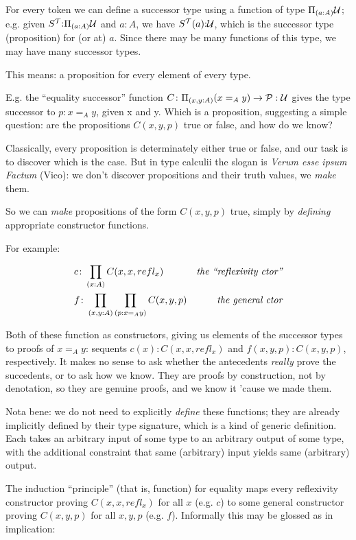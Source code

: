 \documentclass{article}
\begin{document}
For every token we can define a successor type using a function of
type \(\Pi_{(a:A)}\mathcal{U}\); e.g. given
\(S^{\mathcal{T}}{:}\Pi_{(a:A)}\mathcal{U}\) and \(a{:}A\), we have
\(S^{\mathcal{T}}(a){:}\mathcal{U}\), which is the successor type
(proposition) for (or at) \(a\).  Since there may be many functions of
this type, we may have many successor types.

This means: a proposition for every element of every type.

E.g. the ``equality successor'' function \(C\colon\Pi_{(x,y:A)}(x=_Ay)\to\mathcal{P:U}\) gives the type
successor to \(p{:}x=_Ay\), given x and y.  Which is a proposition,
suggesting a simple question: are the propositions \(C(x,y,p)\) true
or false, and how do we know?

Classically, every proposition is determinately either true or false,
and our task is to discover which is the case.  But in type calculii
the slogan is \emph{Verum esse ipsum Factum} (Vico): we don't discover
propositions and their truth values, we \emph{make} them.

So we can \emph{make} propositions of the form \(C(x,y,p)\) true,
simply by \emph{defining} appropriate constructor functions.

For example:

\begin{align}
  &c\colon\prod\limits_{(x:A)}C(x,x,refl_x) & \textit{the ``reflexivity ctor''} \\
  &f\colon\prod\limits_{(x,y:A)}\prod\limits_{(p:x=_Ay)}C(x,y,p) & \textit{the general ctor}
\end{align}

Both of these function as constructors, giving us elements of the
successor types to proofs of \(x=_Ay\): sequents
\(c(x){:}C(x,x,refl_x)\) and \(f(x,y,p){:}C(x,y,p)\),
respectively.  It makes no sense to ask whether the antecedents
\emph{really} prove the succedents, or to ask how we know.  They are
proofs by construction, not by denotation, so they are genuine proofs,
and we know it 'cause we made them.

Nota bene: we do not need to explicitly \emph{define} these functions;
they are already implicitly defined by their type signature, which is
a kind of generic definition.  Each takes an arbitrary input of some
type to an arbitrary output of some type, with the additional
constraint that same (arbitrary) input yields same (arbitrary) output.

The induction ``principle'' (that is, function) for equality maps every
reflexivity constructor proving \(C(x,x,refl_x)\) for all \(x\)
(e.g. \(c\)) to some general constructor proving \(C(x,y,p)\) for all
\(x,y,p\) (e.g. \(f\)).  Informally this may be glossed as in
implication:
\end{document}
